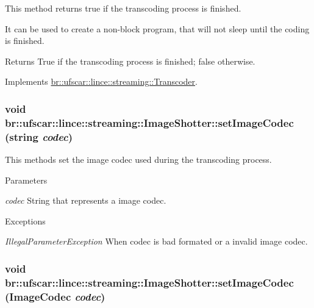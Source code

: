 This method returns true if the transcoding process is finished. 

It can be used to create a non-\/block program, that will not sleep until the coding is finished. \begin{DoxyReturn}{Returns}
True if the transcoding process is finished; false otherwise. 
\end{DoxyReturn}


Implements \hyperlink{classbr_1_1ufscar_1_1lince_1_1streaming_1_1Transcoder_a6d2588da9583e98496882efa9b472ec4}{br::ufscar::lince::streaming::Transcoder}.

\hypertarget{classbr_1_1ufscar_1_1lince_1_1streaming_1_1ImageShotter_a625630582196a1d12d576c8ffea2e3b8}{
\subsubsection[{setImageCodec}]{\setlength{\rightskip}{0pt plus 5cm}void br::ufscar::lince::streaming::ImageShotter::setImageCodec (string {\em codec})}}
\label{classbr_1_1ufscar_1_1lince_1_1streaming_1_1ImageShotter_a625630582196a1d12d576c8ffea2e3b8}


This methods set the image codec used during the transcoding process. 


\begin{DoxyParams}{Parameters}
\item[{\em codec}]String that represents a image codec. \end{DoxyParams}

\begin{DoxyExceptions}{Exceptions}
\item[{\em IllegalParameterException}]When codec is bad formated or a invalid image codec. \end{DoxyExceptions}
\hypertarget{classbr_1_1ufscar_1_1lince_1_1streaming_1_1ImageShotter_add200f16fd87f355bc7163cca546f52a}{
\subsubsection[{setImageCodec}]{\setlength{\rightskip}{0pt plus 5cm}void br::ufscar::lince::streaming::ImageShotter::setImageCodec ({\bf ImageCodec} {\em codec})}}
\label{classbr_1_1ufscar_1_1lince_1_1streaming_1_1ImageShotter_add200f16fd87f355bc7163cca546f52a}



